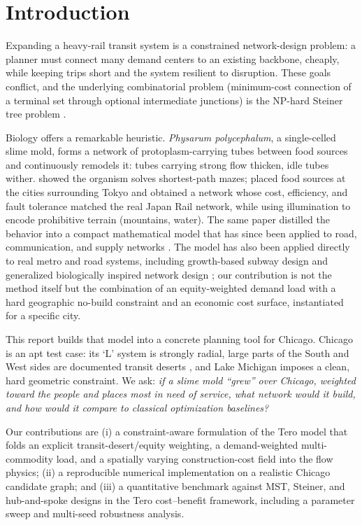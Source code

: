 \documentclass[11pt]{article}
\begin{document}
\section{Introduction}
Expanding a heavy-rail transit system is a constrained network-design problem: a
planner must connect many demand centers to an existing backbone, cheaply, while
keeping trips short and the system resilient to disruption. These goals conflict,
and the underlying combinatorial problem (minimum-cost connection of a terminal set
through optional intermediate junctions) is the NP-hard Steiner tree problem
\citep{hwang1992}.

Biology offers a remarkable heuristic. \emph{Physarum polycephalum}, a single-celled
slime mold, forms a network of protoplasm-carrying tubes between food sources and
continuously remodels it: tubes carrying strong flow thicken, idle tubes wither.
\citet{nakagaki2000} showed the organism solves shortest-path mazes; \citet{tero2010}
placed food sources at the cities surrounding Tokyo and obtained a network whose cost,
efficiency, and fault tolerance matched the real Japan Rail network, while using
illumination to encode prohibitive terrain (mountains, water). The same paper distilled
the behavior into a compact mathematical model that has since been applied to road,
communication, and supply networks \citep{tero2007,watanabe2014,sun2017}.
The model has also been applied directly to real metro and road systems, including
growth-based subway design \citep{kay2022} and generalized biologically inspired network
design \citep{zhang2015}; our contribution is not the method itself but the combination of
an equity-weighted demand load with a hard geographic no-build constraint and an economic
cost surface, instantiated for a specific city.

This report builds that model into a concrete planning tool for Chicago. Chicago is an
apt test case: its `L' system is strongly radial, large parts of the South and West
sides are documented transit deserts \citep{transitdesert2025}, and Lake Michigan
imposes a clean, hard geometric constraint. We ask: \emph{if a slime mold ``grew''
over Chicago, weighted toward the people and places most in need of service, what
network would it build, and how would it compare to classical optimization baselines?}

Our contributions are (i) a constraint-aware formulation of the Tero model that folds an
explicit transit-desert/equity weighting, a demand-weighted multi-commodity load, and a
spatially varying construction-cost field into the flow physics; (ii) a reproducible numerical implementation on a realistic Chicago
candidate graph; and (iii) a quantitative benchmark against MST, Steiner, and
hub-and-spoke designs in the Tero cost--benefit framework, including a parameter
sweep and multi-seed robustness analysis.
\end{document}
